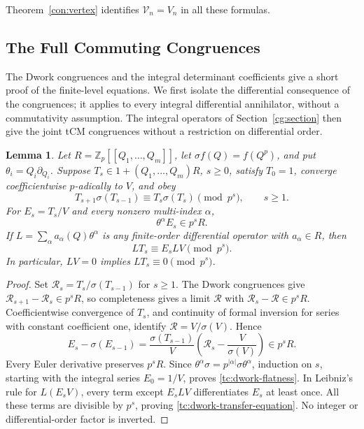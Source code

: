 \documentclass[11pt]{amsart}
\newtheorem{lemma}[theorem]{Lemma}
\theoremstyle{definition}
\theoremstyle{remark}
\numberwithin{equation}{section}
\newcommand{\Z}{\mathbb Z}
\begin{document}
Theorem~\ref{con:vertex} identifies $\mathcal V_n=V_n$ in all these formulas.

\subsection{The Full Commuting Congruences}
The Dwork congruences and the integral determinant coefficients
give a short proof of the finite-level equations. We first
isolate the differential consequence of the congruences; it
applies to every integral differential annihilator, without a
commutativity assumption. The integral operators of Section~\ref{cg:section} then give
the joint tCM congruences without a restriction on differential order.

\begin{lemma}\label{tc:dwork-transfer}
Let $R=\Z_p[[Q_1,\ldots,Q_m]]$, let
$\sigma f(Q)=f(Q^p)$, and put $\theta_i=Q_i\partial_{Q_i}$.
Suppose $T_s\in1+(Q_1,\ldots,Q_m)R$, $s\geq0$, satisfy
$T_0=1$, converge coefficientwise $p$-adically to $V$, and obey
\[
 T_{s+1}\sigma(T_{s-1})\equiv T_s\sigma(T_s)\pmod{p^s},
 \qquad s\geq1.
\]
For $E_s=T_s/V$ and every nonzero multi-index $\alpha$,
\begin{equation}\label{tc:dwork-flatness}
 \theta^\alpha E_s\in p^sR.
\end{equation}
If $L=\sum_\alpha a_\alpha(Q)\theta^\alpha$ is any finite-order
differential operator with $a_\alpha\in R$, then
\begin{equation}\label{tc:dwork-transfer-equation}
 LT_s\equiv E_sLV\pmod{p^s}.
\end{equation}
In particular, $LV=0$ implies $LT_s\equiv0\pmod{p^s}$.
\end{lemma}

\begin{proof}
Set $\mathcal R_s=T_s/\sigma(T_{s-1})$ for $s\geq1$.
The Dwork congruences give
$\mathcal R_{s+1}-\mathcal R_s\in p^sR$, so completeness gives
a limit $\mathcal R$ with
$\mathcal R_s-\mathcal R\in p^sR$.
Coefficientwise convergence of $T_s$, and continuity of formal
inversion for series with constant coefficient one, identify
$\mathcal R=V/\sigma(V)$. Hence
\[
 E_s-\sigma(E_{s-1})
 =\frac{\sigma(T_{s-1})}{V}
   \left(\mathcal R_s-\frac{V}{\sigma(V)}\right)
 \in p^sR.
\]
Every Euler derivative preserves $p^sR$. Since
$\theta^\alpha\sigma=p^{|\alpha|}\sigma\theta^\alpha$,
induction on $s$, starting with the integral series $E_0=1/V$,
proves \eqref{tc:dwork-flatness}. In Leibniz's rule for
$L(E_sV)$, every term except $E_sLV$ differentiates $E_s$
at least once. All these terms are divisible by $p^s$,
proving \eqref{tc:dwork-transfer-equation}. No integer or
differential-order factor is inverted.
\end{proof}
\end{document}
